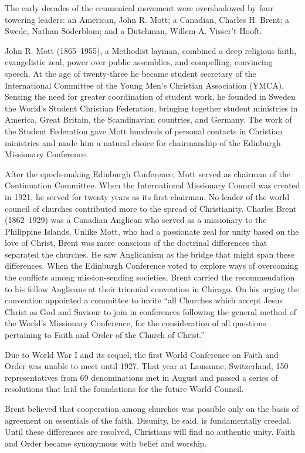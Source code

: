 The early decades of the ecumenical movement were overshadowed by four towering leaders: an
American, John R. Mott; a Canadian, Charles H. Brent; a Swede, Nathan Söderblom; and a Dutchman,
Willem A. Visser’t Hooft.

John R. Mott (1865–1955), a Methodist layman, combined a deep religious faith, evangelistic zeal,
power over public assemblies, and compelling, convincing speech. At the age of twenty-three he
became student secretary of the International Committee of the Young Men’s Christian Association
(YMCA). Sensing the need for greater coordination of student work, he founded in Sweden the World’s
Student Christian Federation, bringing together student ministries in America, Great Britain, the
Scandinavian countries, and Germany. The work of the Student Federation gave Mott hundreds of
personal contacts in Christian ministries and made him a natural choice for chairmanship of the
Edinburgh Missionary Conference.

After the epoch-making Edinburgh Conference, Mott served as chairman of the Continuation Committee.
When the International Missionary Council was created in 1921, he served for twenty years as its
first chairman. No leader of the world council of churches contributed more to the spread of
Christianity. Charles Brent (1862–1929) was a Canadian Anglican who served as a missionary to the
Philippine Islands. Unlike Mott, who had a passionate zeal for unity based on the love of Christ,
Brent was more conscious of the doctrinal differences that separated the churches. He saw
Anglicanism as the bridge that might span these differences. When the Edinburgh Conference voted to
explore ways of overcoming the conflicts among mission-sending societies, Brent carried the
recommendation to his fellow Anglicans at their triennial convention in Chicago. On his urging the
convention appointed a committee to invite “all Churches which accept Jesus Christ as God and
Saviour to join in conferences following the general method of the World’s Missionary Conference,
for the consideration of all questions pertaining to Faith and Order of the Church of Christ.”

Due to World War I and its sequel, the first World Conference on Faith and Order was unable to meet
until 1927. That year at Lausanne, Switzerland, 150 representatives from 69 denominations met in
August and passed a series of resolutions that laid the foundations for the future World Council.

Brent believed that cooperation among churches was possible only on the basis of agreement on
essentials of the faith. Disunity, he said, is fundamentally creedal. Until these differences are
resolved, Christians will find no authentic unity. Faith and Order became synonymous with belief and
worship.


